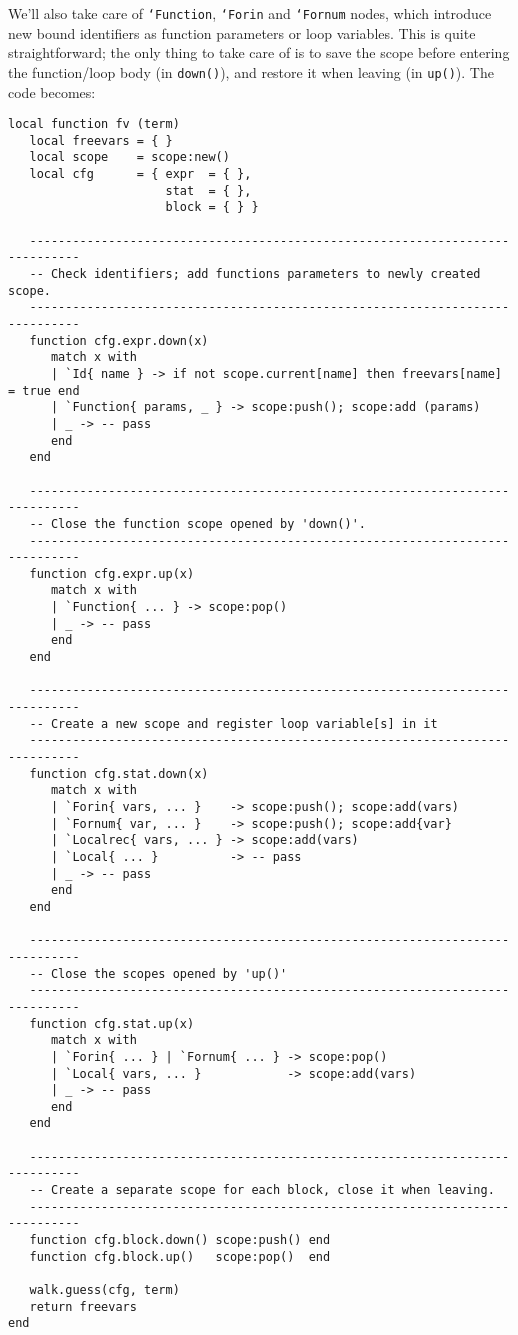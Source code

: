 We'll also take care of {\tt`Function}, {\tt`Forin} and {\tt`Fornum} nodes,
which introduce new bound identifiers as function parameters or loop variables.
This is quite straightforward; the only thing to take care of is to save the
scope before entering the function/loop body (in {\tt down()}), and restore it
when leaving (in {\tt up()}). The code becomes:

  
\begin{verbatim}
local function fv (term)
   local freevars = { }
   local scope    = scope:new()
   local cfg      = { expr  = { },
                      stat  = { },
                      block = { } }

   -----------------------------------------------------------------------------
   -- Check identifiers; add functions parameters to newly created scope.
   -----------------------------------------------------------------------------
   function cfg.expr.down(x)
      match x with
      | `Id{ name } -> if not scope.current[name] then freevars[name] = true end
      | `Function{ params, _ } -> scope:push(); scope:add (params)
      | _ -> -- pass
      end
   end

   -----------------------------------------------------------------------------
   -- Close the function scope opened by 'down()'.
   -----------------------------------------------------------------------------
   function cfg.expr.up(x)  
      match x with
      | `Function{ ... } -> scope:pop()
      | _ -> -- pass
      end
   end

   -----------------------------------------------------------------------------
   -- Create a new scope and register loop variable[s] in it
   -----------------------------------------------------------------------------
   function cfg.stat.down(x)
      match x with
      | `Forin{ vars, ... }    -> scope:push(); scope:add(vars)
      | `Fornum{ var, ... }    -> scope:push(); scope:add{var}
      | `Localrec{ vars, ... } -> scope:add(vars)
      | `Local{ ... }          -> -- pass
      | _ -> -- pass
      end
   end

   -----------------------------------------------------------------------------
   -- Close the scopes opened by 'up()'
   -----------------------------------------------------------------------------
   function cfg.stat.up(x)
      match x with
      | `Forin{ ... } | `Fornum{ ... } -> scope:pop()
      | `Local{ vars, ... }            -> scope:add(vars)
      | _ -> -- pass
      end
   end

   -----------------------------------------------------------------------------
   -- Create a separate scope for each block, close it when leaving.
   -----------------------------------------------------------------------------
   function cfg.block.down() scope:push() end
   function cfg.block.up()   scope:pop()  end

   walk.guess(cfg, term)
   return freevars
end
\end{verbatim}

